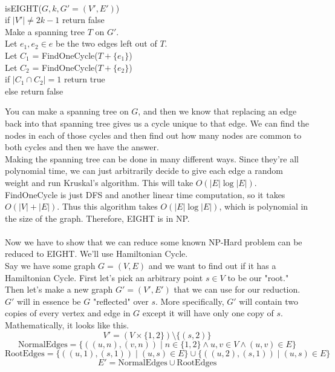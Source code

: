 \documentclass[11pt]{article}
\begin{document}
\begin{solution}
\begin{algo}
        \\ isEIGHT($G, k, G' = (V', E')$) \+
        \\ if $|V'| \not = 2k - 1$ return false
        \\ Make a spanning tree $T$ on $G'$. 
        \\ Let $e_1, e_2 \in e$ be the two edges left out of $T$.
        \\ Let $C_1$ = FindOneCycle($T + \{e_1\}$)
        \\ Let $C_2$ = FindOneCycle($T + \{e_2\}$)
        \\ if $|C_1 \cap C_2| = 1$ return true
        \\ else return false
    \end{algo}
    You can make a spanning tree on $G$, and then we know that replacing an edge back into that spanning tree gives us a cycle unique to that edge. We can find the nodes in each of those cycles and then find out how many nodes are common to both cycles and then we have the answer. 
    \\ Making the spanning tree can be done in many different ways. Since they're all polynomial time, we can just arbitrarily decide to give each edge a random weight and run Kruskal's algorithm. This will take $O(|E| \log |E|)$. FindOneCycle is just DFS and another linear time computation, so it takes $O(|V| + |E|)$. Thus this algorithm takes $O(|E| \log |E|)$, which is polynomial in the size of the graph. Therefore, EIGHT is in NP.
    \\\\ Now we have to show that we can reduce some known NP-Hard problem can be reduced to EIGHT. We'll use Hamiltonian Cycle. 
    \\ Say we have some graph $G = (V, E)$ and we want to find out if it has a Hamiltonian Cycle. First let's pick an arbitrary point $s \in V$ to be our "root." Then let's make a new graph $G' = (V', E')$ that we can use for our reduction. $G'$ will in essence be $G$ "reflected" over $s$. More specifically, $G'$ will contain two copies of every vertex and edge in $G$ except it will have only one copy of $s$. Mathematically, it looks like this. 
    \[
        V' = (V \times \{1, 2\}) \setminus \{(s, 2)\}
    \]
    \[ 
        \text{NormalEdges} = \{((u, n), (v, n)) \mid n \in \{1, 2\} \land u, v \in V \land (u, v) \in E\}
    \]
    \[
        \text{RootEdges} = \{((u, 1), (s, 1)) \mid (u, s) \in E\} \cup \{((u, 2), (s, 1)) \mid (u, s) \in E\}
    \]
    \[
        E' = \text{NormalEdges} \cup \text{RootEdges}
    \]

\end{solution}
\end{document}
